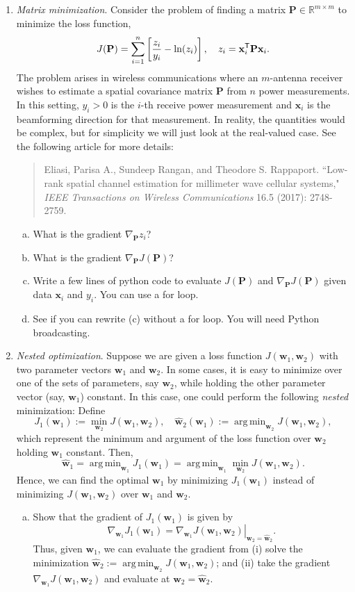 \documentclass[11pt]{article}
\def\R{{\mathbb{R}}}
\def\argmin{\mathop{\mathrm{arg\,min}}}
\def\x{\times}
\newcommand{\wbf}{\mathbf{w}}
\newcommand{\wbfhat}{\widehat{\mathbf{w}}}
\newcommand{\xbf}{\mathbf{x}}
\newcommand{\Pbf}{\mathbf{P}}
\newcommand{\tran}{^{\text{\sf T}}}
\begin{document}
\begin{enumerate}
\item \emph{Matrix minimization}.  Consider the problem of finding a matrix
$\Pbf \in \R^{m \x m}$ to minimize the loss function,
\[
    J(\Pbf) = \sum_{i=1}^n \left[ \frac{z_i}{y_i} - \ln(z_i) \right],
    \quad
    z_i = \xbf_i\tran \Pbf \xbf_i.
\]
The problem arises in wireless communications where an $m$-antenna receiver wishes
to estimate a spatial covariance matrix $\Pbf$ from $n$ power measurements.
In this setting, $y_i > 0$ is the $i$-th receive power measurement and $\xbf_i$
is the beamforming direction for that measurement.  In reality, the quantities
would be complex, but for simplicity we will just look at the real-valued case.
See the following article for more details:
\begin{quote}
  Eliasi, Parisa A., Sundeep Rangan, and Theodore S. Rappaport. ``Low-rank spatial channel estimation for millimeter wave cellular systems," \emph{IEEE Transactions on Wireless Communications} 16.5 (2017): 2748-2759.
\end{quote}
\begin{enumerate}[(a)]
\item What is the gradient $\nabla_{\Pbf} z_i$?

\item What is the gradient $\nabla_{\Pbf} J(\Pbf)$?

\item Write a few lines of python code to evaluate $J(\Pbf)$ and
$\nabla_{\Pbf} J(\Pbf)$ given data $\xbf_i$ and $y_i$.  You can use a for loop.

\item See if you can rewrite (c) without a for loop.  You will need Python broadcasting.
\end{enumerate}

\item \emph{Nested optimization}.  Suppose we are given a loss function
$J(\wbf_1,\wbf_2)$ with two parameter vectors $\wbf_1$ and $\wbf_2$.
In some cases, it is easy to minimize over one of the sets of parameters, say
$\wbf_2$, while holding the other parameter vector (say, $\wbf_1$) constant.
In this case, one could perform the following \emph{nested} minimization:
Define
\[
    J_1(\wbf_1) := \min_{\wbf_2} J(\wbf_1,\wbf_2), \quad
    \wbfhat_2(\wbf_1) := \argmin_{\wbf_2} J(\wbf_1,\wbf_2),
\]
which represent the minimum and argument of the loss function over $\wbf_2$
holding $\wbf_1$ constant.   Then,
\[
    \wbfhat_1 = \argmin_{\wbf_1} J_1(\wbf_1) = \argmin_{\wbf_1} \min_{\wbf_2}
    J(\wbf_1,\wbf_2).
\]
Hence, we can find the optimal $\wbf_1$ by minimizing $J_1(\wbf_1)$
instead of minimizing $J(\wbf_1,\wbf_2)$ over $\wbf_1$ and $\wbf_2$.
\begin{enumerate}[(a)]
\item Show that the gradient of $J_1(\wbf_1)$ is given by
\[
    \nabla_{\wbf_1} J_1(\wbf_1) = \left. \nabla_{\wbf_1} J(\wbf_1,\wbf_2)\right|_{\wbf_2=\wbfhat_2}.
\]
Thus, given $\wbf_1$, we can evaluate the gradient from (i) solve the minimization
$\wbfhat_2:= \argmin_{\wbf_2} J(\wbf_1,\wbf_2)$; and (ii) take the gradient
$\nabla_{\wbf_1} J(\wbf_1,\wbf_2)$ and evaluate at $\wbf_2 = \wbfhat_2$.


\end{enumerate}
\end{enumerate}
\end{document}
